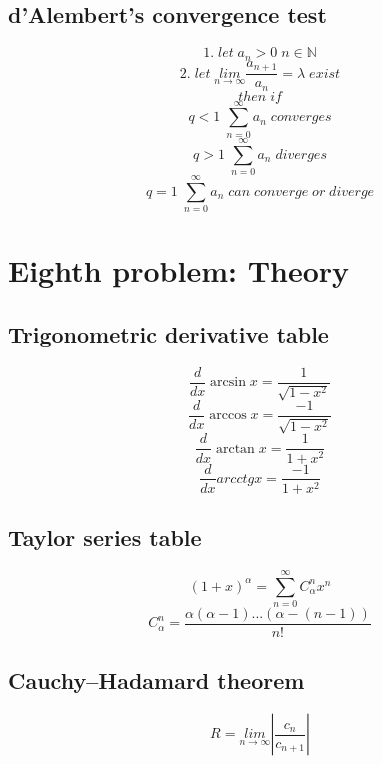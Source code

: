 \documentclass{article}
\begin{document}
\subsection{d'Alembert's convergence test}
\begin{equation*}
    1. \; let \; a_n>0 \; n \in \mathbb N
\end{equation*}
\begin{equation*}
    2. \; let \; \underset{n \rightarrow \infty}{lim} \frac{a_{n+1}}{a_n} = \lambda \; exist
\end{equation*}
\begin{equation*}
    then \; if
\end{equation*}
\begin{equation*}
    q<1 \; \sum_{n=0}^{\infty} a_n \; converges
\end{equation*}
\begin{equation*}
    q>1 \; \sum_{n=0}^{\infty} a_n \; diverges
\end{equation*}
\begin{equation*}
    q=1 \; \sum_{n=0}^{\infty} a_n \; can \; converge \; or \; diverge
\end{equation*}


\newpage
\section{Eighth problem: Theory}

\hypertarget{8.1}{}
\subsection{Trigonometric derivative table}
\begin{equation*}
    \frac{d}{dx}\arcsin x = \frac{1}{\sqrt{1-x^2}}
\end{equation*}
\begin{equation*}
    \frac{d}{dx}\arccos x = \frac{-1}{\sqrt{1-x^2}}
\end{equation*}
\begin{equation*}
    \frac{d}{dx} \arctan x = \frac{1}{1+x^2}
\end{equation*}
\begin{equation*}
    \frac{d}{dx} arcctg x = \frac{-1}{1+x^2}
\end{equation*}

\hypertarget{8.2}{}
\subsection{Taylor series table}
\begin{equation*}
    (1+x)^\alpha = \sum_{n=0}^{\infty} C_{\alpha}^n x^n
\end{equation*}
\begin{equation*}
    C_{\alpha}^n = \frac{\alpha(\alpha - 1)...(\alpha - (n - 1))}{n!}
\end{equation*}

\hypertarget{8.3}{}
\subsection{Cauchy–Hadamard theorem}
\begin{equation*}
    R = \underset{n \rightarrow \infty}{lim} |\frac{c_n}{c_{n+1}}|
\end{equation*}
\end{document}

